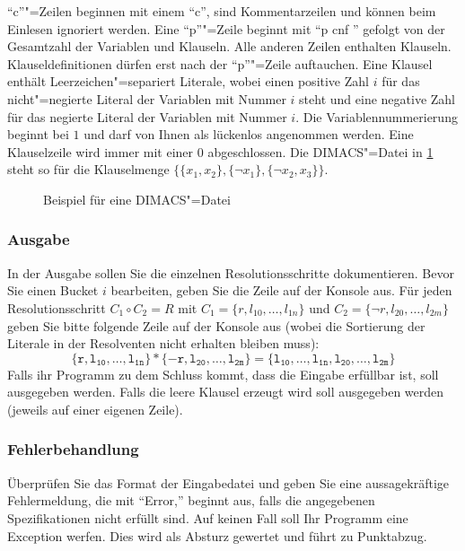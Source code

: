 \documentclass{sdqassignment}
\begin{document}
\enquote{c}"=Zeilen beginnen mit einem \enquote{c}, sind Kommentarzeilen und können beim Einlesen ignoriert werden. Eine \enquote{p}"=Zeile beginnt mit \enquote{p cnf } gefolgt von der Gesamtzahl der Variablen und Klauseln. Alle anderen Zeilen enthalten Klauseln. Klauseldefinitionen dürfen erst nach der \enquote{p}"=Zeile auftauchen. Eine Klausel enthält Leerzeichen"=separiert Literale, wobei einen positive Zahl $i$ für das nicht"=negierte Literal der Variablen mit Nummer $i$ steht und eine negative Zahl für das negierte Literal der Variablen mit Nummer $i$. Die Variablennummerierung beginnt bei $1$ und darf von Ihnen als lückenlos angenommen werden. Eine Klauselzeile wird immer mit einer $0$ abgeschlossen. Die DIMACS"=Datei in \cref{dimacs} steht so für die Klauselmenge $\{\{x_1, x_2\}, \{\lnot x_1\}, \{ \lnot x_2, x_3 \} \}$.

\begin{figure}[ht]
\caption{Beispiel für eine DIMACS"=Datei}
\label{dimacs}
\end{figure}

\subsubsection{Ausgabe}
In der Ausgabe sollen Sie die einzelnen Resolutionsschritte dokumentieren. Bevor Sie einen Bucket $i$ bearbeiten, geben Sie die Zeile  auf der Konsole aus. Für jeden Resolutionsschritt $C_1 \circ C_2 = R$ mit $C_1 = \{r, l_{10}, \dots, l_{1n}\}$ und $C_2 = \{\lnot r, l_{20}, \dots, l_{2m}\}$ geben Sie bitte folgende Zeile auf der Konsole aus (wobei die Sortierung der Literale in der Resolventen nicht erhalten bleiben muss): $$\mathtt{ \{r, l_{10}, \dots, l_{1n}\} * \{-r, l_{20}, \dots, l_{2m}\} = \{l_{10}, \dots, l_{1n}, l_{20}, \dots, l_{2m}\} }$$ Falls ihr Programm zu dem Schluss kommt, dass die Eingabe erfüllbar ist, soll  ausgegeben werden. Falls die leere Klausel erzeugt wird soll  ausgegeben werden (jeweils auf einer eigenen Zeile).

\subsubsection{Fehlerbehandlung}

Überprüfen Sie das Format der Eingabedatei und geben Sie eine aussagekräftige Fehlermeldung, die mit \enquote{Error,} beginnt aus, falls die angegebenen Spezifikationen nicht erfüllt sind. Auf keinen Fall soll Ihr Programm eine Exception werfen. Dies wird als Absturz gewertet und führt zu Punktabzug.
\end{document}
